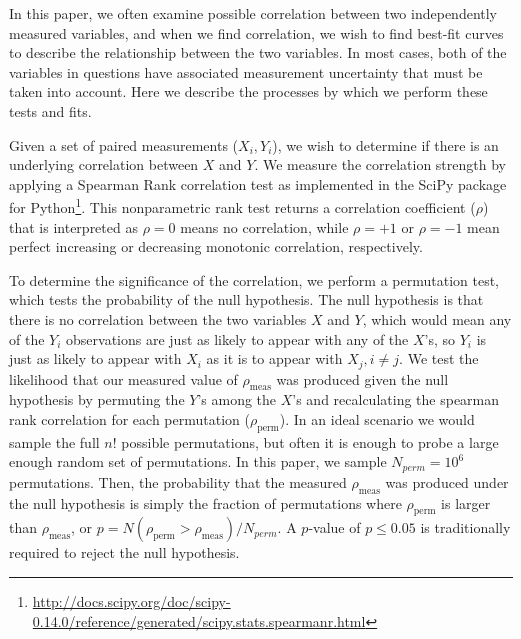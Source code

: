 \documentclass[a4paper,fleqn,usenatbib]{mnras}
\begin{document}
In this paper, we often examine possible correlation between two independently measured variables, and when we find correlation, we wish to find best-fit curves to describe the relationship between the two variables. In most cases, both of the variables in questions have associated measurement uncertainty that must be taken into account. Here we describe the processes by which we perform these tests and fits. 

Given a set of paired measurements ($X_{i}, Y_{i}$), we wish to determine if there is an underlying correlation between $X$ and $Y$. We measure the correlation strength by applying a Spearman Rank correlation test \citep{1904AJP...15...72} as implemented in the SciPy package \citep{2001SciPy}  for Python\footnote{\url{http://docs.scipy.org/doc/scipy-0.14.0/reference/generated/scipy.stats.spearmanr.html}}. This nonparametric rank test returns a correlation coefficient ($\rho$) that is interpreted as $\rho = 0$ means no correlation, while $\rho = +1$ or $\rho = -1$ mean perfect increasing or decreasing monotonic correlation, respectively. 

To determine the significance of the correlation, we perform a permutation test, which tests the probability of the null hypothesis. The null hypothesis is that there is no correlation between the two variables $X$ and $Y$, which would mean any of the $Y_{i}$ observations are just as likely to appear with any of the $X$'s, so $Y_{i}$ is just as likely to appear with $X_{i}$ as it is to appear with $X_{j}, i \neq j$.  We test the likelihood that our measured value of $\rho_{\mathrm{meas}}$ was produced given the null hypothesis by permuting the $Y$'s among the $X$'s and recalculating the spearman rank correlation for each permutation ($\rho_{\mathrm{perm}}$). In an ideal scenario we would sample the full $n!$ possible permutations, but often it is enough to probe a large enough random set of permutations. In this paper, we sample $N_{perm} = 10^{6}$ permutations. Then, the probability that the measured $\rho_{\mathrm{meas}}$ was produced under the null hypothesis is simply the fraction of permutations where $\rho_{\mathrm{perm}}$ is larger than $\rho_{\mathrm{meas}}$, or $p = N(\rho_{\mathrm{perm}} > \rho_{\mathrm{meas}}) / N_{perm}$. A $p$-value of $p \leq 0.05 $ is traditionally required to reject the null hypothesis.

\end{document}
